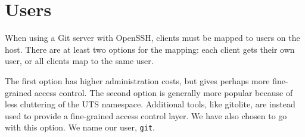 
\section{Users}

When using a Git server with OpenSSH, clients must be mapped to users on the
host. There are at least two options for the mapping: each client gets their
own user, or all clients map to the same user.

The first option has higher administration costs, but gives perhaps more
fine-grained access control. The second option is generally more popular
because of less cluttering of the UTS namespace. Additional tools, like
gitolite, are instead used to provide a fine-grained access control layer. We
have also chosen to go with this option. We name our user, \texttt{git}.
